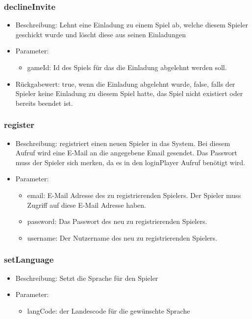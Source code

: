 \documentclass[a4paper]{scrreprt}
\begin{document}
    \subsubsection{declineInvite}
    \begin{itemize}
        \item Beschreibung: Lehnt eine Einladung zu einem Spiel ab, welche diesem Spieler geschickt wurde und löscht diese aus seinen Einladungen
        \item Parameter:
        \begin{itemize}
            \item gameId: Id des Spiels für das die Einladung abgelehnt werden soll.
        \end{itemize}
        \item Rückgabewert: true, wenn die Einladung abgelehnt wurde, false, falls der Spieler keine Einladung zu diesem Spiel hatte, das Spiel nicht existiert oder bereits beendet ist.
    \end{itemize}


    \subsubsection{register}
    \begin{itemize}
        \item Beschreibung: registriert einen neuen Spieler in das System. Bei diesem Aufruf wird eine E-Mail an die angegebene Email gesendet. Das Passwort muss der Spieler sich merken, da es in den loginPlayer Aufruf benötigt wird.
        \item Parameter:
        \begin{itemize}
            \item email: E-Mail Adresse des zu registrierenden Spielers. Der Spieler muss Zugriff auf diese E-Mail Adresse haben.
            \item password: Das Passwort des neu zu registrierenden Spielers.
            \item username: Der Nutzername des neu zu registrierenden Spielers.
        \end{itemize}
    \end{itemize}


    \subsubsection{setLanguage}
    \begin{itemize}
        \item Beschreibung: Setzt die Sprache für den Spieler
        \item Parameter:
        \begin{itemize}
            \item langCode: der Landescode für die gewünschte Sprache
        \end{itemize}
    \end{itemize}
\end{document}
